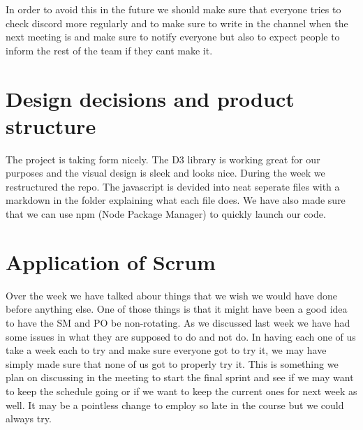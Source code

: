 \documentclass{scrartcl}
\begin{document}
In order to avoid this in the future we should make sure that everyone tries to check discord more regularly and to make sure to write in the channel when the next meeting is and make sure to notify everyone but also to expect people to inform the rest of the team if they cant make it.







\section{Design decisions and product structure}
The project is taking form nicely. The D3 library is working great for our purposes and the visual design is sleek and looks nice. During the week we restructured the repo. The javascript is devided into neat seperate files with a markdown in the folder explaining what each file does. We have also made sure that we can use npm (Node Package Manager) to quickly launch our code.




\section{Application of Scrum}
Over the week we have talked abour things that we wish we would have done before anything else. One of those things is that it might have been a good idea to have the SM and PO be non-rotating. As we discussed last week we have had some issues in what they are supposed to do and not do. In having each one of us take a week each to try and make sure everyone got to try it, we may have simply made sure that none of us got to properly try it. This is something we plan on discussing in the meeting to start the final sprint and see if we may want to keep the schedule going or if we want to keep the current ones for next week as well. It may be a pointless change to employ so late in the course but we could always try. 
\end{document}
